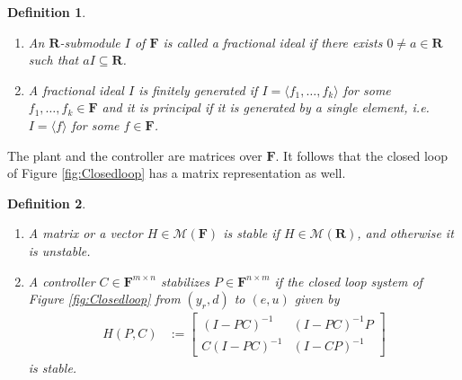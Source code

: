 \documentclass[11pt, a4paper]{amsart}
\newcommand{\inv}{^{-1}}
\newtheorem{defin}{Definition}
\newcommand{\N}{\mathbb{N}}						%
\newcommand{\definedset}[2]{\left\{#1\, \middle|\, #2  \right\}}	%
\newcommand{\matrices}[1]{\mathcal{M}\left( #1 \right)}		%
\newcommand{\error}{e}										%
\newcommand{\control}{u}									%
\newcommand{\measurement}{y}								%
\newcommand{\reference}{\measurement_r}						%
\newcommand{\disturbance}{d}								%
\newcommand{\Plant}{P}										%
\newcommand{\Cont}{C}										%
\newcommand{\Closedloop}[1]{H( #1 )}						%
\newcommand{\stable}{\mathbf{R}}							%
\newcommand{\fractions}[1]{\mathbf{F}} %
\newcommand{\J}{\mathbf{J}}									%
\newcommand{\I}{\mathbf{I}}									%
\begin{document}
\begin{defin}\begin{enumerate}
\item An $\stable$-submodule $I$ of $\fractions{\stable}$ is called \emph{a fractional ideal} if there exists $0\neq a\in\stable$ such that $a I\subseteq\stable$.
\item A fractional ideal $I$ is \emph{finitely generated} if $I=\langle f_1,\ldots,f_k\rangle$ for some $f_1,\ldots,f_k\in\fractions{\stable}$ and it is
\emph{principal} if it is generated by a single element, i.e. $I=\langle f\rangle$ for some $f\in\fractions{\stable}$.
\end{enumerate}

\end{defin}

The plant and the controller are matrices over $\fractions{\stable}$. It follows that the closed loop of Figure \ref{fig:Closedloop} has a matrix representation as well.
\begin{defin}
\begin{enumerate}
\item A matrix or a vector $H\in\matrices{\fractions{\stable}}$ is \emph{stable} if $H\in\matrices{\stable}$, and otherwise it is unstable.

\item A controller $\Cont\in\fractions{\stable}^{m\times n}$ \emph{stabilizes} $\Plant\in\fractions{\stable}^{n\times m}$ if the closed loop system of Figure \ref{fig:Closedloop} from $(\reference,\disturbance)$ to $(\error,\control)$ given by
\begin{align*}
\Closedloop{\Plant,\Cont} & :=
\begin{bmatrix}
\left(I-\Plant\Cont\right)\inv  & \left(I-\Plant\Cont\right)\inv \Plant\\
\Cont\left(I-\Plant\Cont\right)\inv  &\left(I-\Cont\Plant\right)\inv 
\end{bmatrix}
\end{align*}
is stable.

\end{enumerate}
\end{defin}
\end{document}
